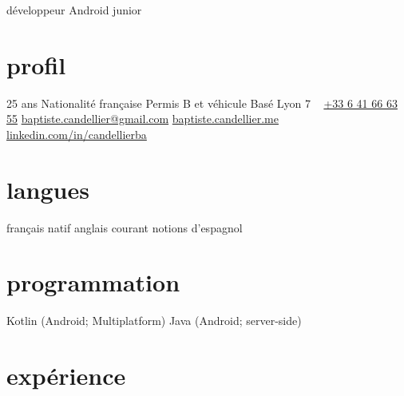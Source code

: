 \documentclass[]{friggeri-cv}
\begin{document}
{développeur Android junior}

\begin{aside}
    \section{profil}
    25 ans
    Nationalité française
    Permis B et véhicule
    Basé Lyon 7
    ~
    \href{tel:0033641666355}{+33 6 41 66 63 55}
    \href{mailto:baptiste.candellier@gmail.com}{baptiste.candellier@gmail.com}
    {\NoAutoSpacing\href{https://baptiste.candellier.me}{baptiste.candellier.me}}
    {\NoAutoSpacing\href{https://www.linkedin.com/in/candellierba/}{linkedin.com/in/candellierba}}
    \section{langues}
    français natif
    anglais courant
    notions d'espagnol
    \section{programmation}
    Kotlin (Android; Multiplatform)
    Java (Android; server-side)
\end{aside}

\section{expérience}
\end{document}
